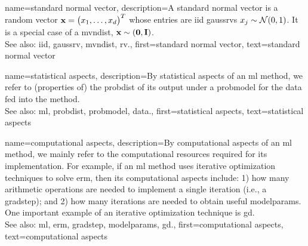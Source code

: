 {name={standard normal vector}, 
	description={A standard normal vector is a random vector ${\bf x}=\big(x_{1},\ldots,x_{d}\big)^{T}$ 
		whose entries are \gls{iid} \glspl{gaussrv} $x_{j} \sim \mathcal{N}(0,1)$. 
		It is a special case of a \gls{mvndist}, ${\bf x} \sim \mathcal(\mathbf{0},\mathbf{I})$.
		\\ 
		See also: \gls{iid}, \gls{gaussrv}, \gls{mvndist}, \gls{rv}.}, 
	first={standard normal vector},
	text={standard normal vector}
}

{name={statistical aspects}, 
	description={By statistical aspects 
		of an \gls{ml} method, we refer to (properties of) the \gls{probdist} of its output 
		under a \gls{probmodel} for the \gls{data} fed into the method.
					\\ 
		See also: \gls{ml}, \gls{probdist}, \gls{probmodel}, \gls{data}.},
	first={statistical aspects},
	text={statistical aspects}
}

{name={computational aspects}, 
	description={By computational 
		aspects of an \gls{ml} method, we mainly refer to the computational 
		resources required for its implementation. For example, if an \gls{ml} method uses iterative 
		optimization techniques to solve \gls{erm}, then its computational aspects include: 1) how 
		many arithmetic operations are needed to implement a single iteration (i.e., a \gls{gradstep}); 
		and 2) how many iterations are needed to obtain useful \gls{modelparams}. One important 
		example of an iterative optimization technique is \gls{gd}.
					\\ 
		See also: \gls{ml}, \gls{erm}, \gls{gradstep}, \gls{modelparams}, \gls{gd}.}, 
	first={computational aspects},
	text={computational aspects}
}


